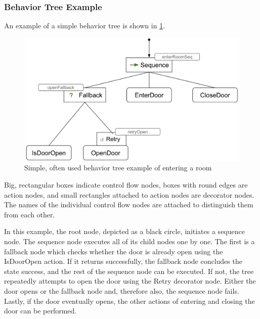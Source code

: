 \subsubsection{Behavior Tree Example}\label{subsubsec:BT_exp}

An example of a simple behavior tree is shown in \cref{fig:BT_exp}.

\begin{figure}[h]
\centering
\includegraphics[scale=0.2]{images/system_overview/BT_example.png}
\caption{Simple, often used behavior tree example of entering a room}
\label{fig:BT_exp}
\end{figure}

Big, rectangular boxes indicate control flow nodes, boxes with round edges are action nodes, and small rectangles attached to action nodes are decorator nodes. The names of the individual control flow nodes are attached to distinguish them from each other.

In this example, the root node, depicted as a black circle, initiates a sequence node. The sequence node executes all of its child nodes one by one. The first is a fallback node which checks whether the door is already open using the IsDoorOpen action. If it returns successfully, the fallback node concludes the state success, and the rest of the sequence node can be executed. If not, the tree repeatedly attempts to open the door using the Retry decorator node. Either the door opens or the fallback node and, therefore also, the sequence node fails. Lastly, if the door eventually opens, the other actions of entering and closing the door can be performed.





